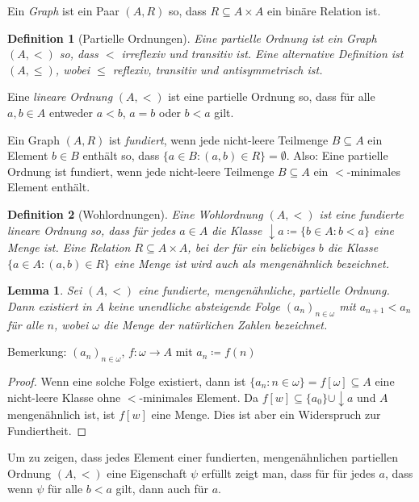 \documentclass[german]{article}
\theoremstyle{break}
\theoremstyle{def_style}
\newtheorem{definition}{Definition}[section]
\theoremstyle{def_style}
\theoremstyle{lemma_style}
\newtheorem{lemma}{Lemma}[subsection]
\begin{document}
Ein \textit{Graph} ist ein Paar $(A, R)$ so, dass $R\subseteq A\times A$ ein binäre Relation ist.

\begin{definition}[Partielle Ordnungen]
	Eine \textit{partielle Ordnung} ist ein Graph $(A,<)$ so, dass $<$ irreflexiv und transitiv ist. Eine alternative Definition ist $(A,\leq)$, wobei $\leq$ reflexiv, transitiv und antisymmetrisch ist.
\end{definition}

Eine \textit{lineare Ordnung} $(A,<)$ ist eine partielle Ordnung so, dass für alle $a,b\in A$ entweder $a<b$, $a=b$ oder $b<a$ gilt.

Ein Graph $(A,R)$ ist \textit{fundiert}, wenn jede nicht-leere Teilmenge $B\subseteq A$ ein Element $b\in B$ enthält so, dass $\{a\in B : (a,b) \in R\}= \emptyset$.
Also: Eine partielle Ordnung ist fundiert, wenn jede nicht-leere Teilmenge $B\subseteq A$ ein $<$-minimales Element enthält.

\begin{definition}[Wohlordnungen]
	Eine \textit{Wohlordnung} $(A,<)$ ist eine fundierte lineare Ordnung so, dass für jedes $a\in A$ die Klasse $\downarrow a\coloneqq \{b\in A : b < a\}$ eine Menge ist.
	Eine Relation $R\subseteq A\times A$, bei der für ein beliebiges $b$ die Klasse $\{a\in A : (a,b)\in R\}$ eine Menge ist wird auch als mengenähnlich bezeichnet.
\end{definition}

\begin{lemma}
	Sei $(A,<)$ eine fundierte, mengenähnliche, partielle Ordnung. Dann existiert in $A$ keine unendliche absteigende Folge $(a_n)_{n\in \omega}$ mit $a_{n+1}<a_n$ für alle $n$, wobei $\omega$ die Menge der natürlichen Zahlen bezeichnet.
\end{lemma}

Bemerkung: $(a_n)_{n\in \omega}$, $f:\omega \to A$ mit $a_n\coloneqq f(n)$

\begin{proof}
	Wenn eine solche Folge existiert, dann ist $\{a_n : n\in \omega\}=f[\omega]\subseteq A$ eine nicht-leere Klasse ohne $<$-minimales Element. Da $f[w]\subseteq \{a_0\}\cup \downarrow a$ und $A$ mengenähnlich ist, ist $f[w]$ eine Menge. Dies ist aber ein Widerspruch zur Fundiertheit.
\end{proof}

Um zu zeigen, dass jedes Element einer fundierten, mengenähnlichen partiellen Ordnung $(A,<)$ eine Eigenschaft $\psi$ erfüllt zeigt man, dass für für jedes $a$, dass wenn $\psi$ für alle $b<a$ gilt, dann auch für $a$.
\end{document}
